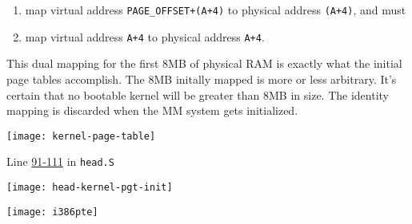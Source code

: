 \begin{enumerate}
\item map virtual address \texttt{PAGE\_OFFSET+(A+4)} to physical address \texttt{(A+4)}, and
  must
\item map virtual address \texttt{A+4} to physical address \texttt{A+4}.
\end{enumerate}

This dual mapping for the first 8MB of physical RAM is exactly what the initial page
tables accomplish. The 8MB initally mapped is more or less arbitrary. It's certain that no
bootable kernel will be greater than 8MB in size. The identity mapping is discarded when
the MM system gets initialized.
  
\begin{center}
  \texttt{[image: kernel-page-table]}
\end{center}

Line \href{http://lxr.linux.no/linux+v2.6.11/arch/i386/kernel/head.S\#L91}{91-111} in
\texttt{head.S}

\begin{center}
  \texttt{[image: head-kernel-pgt-init]}
\end{center}
  
\begin{center}
  \texttt{[image: i386pte]}
\end{center}

